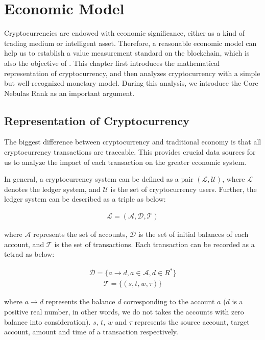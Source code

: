 \section{Economic Model}
Cryptocurrencies are endowed with economic significance, either as a kind of trading medium or intelligent asset. Therefore, a reasonable economic model can help us to establish a value measurement standard on the blockchain, which is also the objective of \nrcore. This chapter first introduces the mathematical representation of cryptocurrency, and then analyzes cryptocurrency with a simple but well-recognized monetary model. During this analysis, we introduce the Core Nebulas Rank as an important argument.

\subsection{Representation of Cryptocurrency}
The biggest difference between cryptocurrency and traditional economy is that all cryptocurrency transactions are traceable. This provides crucial data sources for us to analyze the impact of each transaction on the greater economic system.

In general, a cryptocurrency system can be defined as a pair $(\mathcal{L}, \mathcal{U})$, where $\mathcal{L}$ denotes the ledger system, and $\mathcal{U}$ is the set of cryptocurrency users. Further, the ledger system can be described as a triple as below:

\begin{align}
\mathcal{L} = (\mathcal{A}, \mathcal{D}, \mathcal{T})
\end{align}

\noindent where $\mathcal{A}$ represents the set of accounts, $\mathcal{D}$ is the set of initial balances of each account, and $\mathcal{T}$ is the set of transactions. Each transaction can be recorded as a tetrad as below:

\begin{align}
\mathcal{D} = \{a \rightarrow d, a{\in}\mathcal{A}, d{\in}R^*\}
\end{align}
\begin{align}
\mathcal{T} = \{(s, t, w, \tau)\}
\end{align}

\noindent where $a \rightarrow d$ represents the balance $d$ corresponding to the account $a$ ($d$ is a positive real number, in other words, we do not takes the accounts with zero balance into consideration). $s$, $t$, $w$ and $\tau$ represents the source account, target account, amount and time of a transaction respectively.

